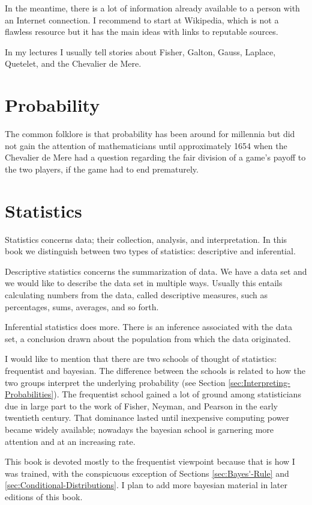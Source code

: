 \documentclass[captions=tableheading]{scrbook}
\begin{document}
In the meantime, there is a lot of information already available to a person with an Internet connection. I recommend to start at Wikipedia, which is not a flawless resource but it has the main ideas with links to reputable sources.

In my lectures I usually tell stories about Fisher, Galton, Gauss, Laplace, Quetelet, and the Chevalier de Mere.
\section{Probability}
\label{sec-1-1}


The common folklore is that probability has been around for millennia but did not gain the attention of mathematicians until approximately 1654 when the Chevalier de Mere had a question regarding the fair division of a game's payoff to the two players, if the game had to end prematurely.
\section{Statistics}
\label{sec-1-2}


Statistics concerns data; their collection, analysis, and interpretation. In this book we distinguish between two types of statistics: descriptive and inferential. 

Descriptive statistics concerns the summarization of data. We have a data set and we would like to describe the data set in multiple ways. Usually this entails calculating numbers from the data, called descriptive measures, such as percentages, sums, averages, and so forth.

Inferential statistics does more. There is an inference associated with the data set, a conclusion drawn about the population from which the data originated.

I would like to mention that there are two schools of thought of statistics: frequentist and bayesian. The difference between the schools is related to how the two groups interpret the underlying probability (see Section \ref{sec:Interpreting-Probabilities}). The frequentist school gained a lot of ground among statisticians due in large part to the work of Fisher, Neyman, and Pearson in the early twentieth century. That dominance lasted until inexpensive computing power became widely available; nowadays the bayesian school is garnering more attention and at an increasing rate.

This book is devoted mostly to the frequentist viewpoint because that is how I was trained, with the conspicuous exception of Sections \ref{sec:Bayes'-Rule} and \ref{sec:Conditional-Distributions}. I plan to add more bayesian material in later editions of this book.
\end{document}
